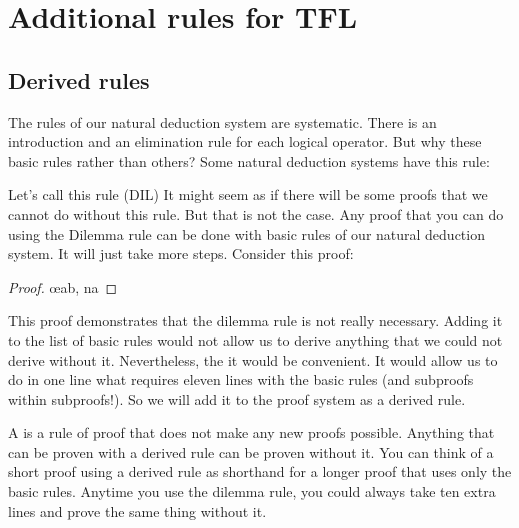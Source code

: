\chapter{Additional rules for TFL}\label{s:Further}

\section{Derived rules}
The rules of our natural deduction system are systematic. There is an introduction and an elimination rule for each logical operator. But why these basic rules rather than others? Some natural deduction systems have this rule:

Let's call this rule  (DIL) It might seem as if there will be some proofs that we cannot do without this rule. But that is not the case. Any proof that you can do using the Dilemma rule can be done with basic rules of our natural deduction system. It will just take more steps. Consider this proof:

\begin{proof}
	 
	 
	\open
		\open
			 
		\close
		\open
		\close
		\oe{ab, na}
	\close
	 
\end{proof}

This proof demonstrates that the dilemma rule is not really necessary. Adding it to the list of basic rules would not allow us to derive anything that we could not derive without it.
Nevertheless, the it would be convenient. It would allow us to do in one line what requires eleven lines with the basic rules (and subproofs within subproofs!). So we will add it to the proof system as a derived rule.

A  is a rule of proof that does not make any new proofs possible. Anything that can be proven with a derived rule can be proven without it. You can think of a short proof using a derived rule as shorthand for a longer proof that uses only the basic rules. Anytime you use the dilemma rule, you could always take ten extra lines and prove the same thing without it.

